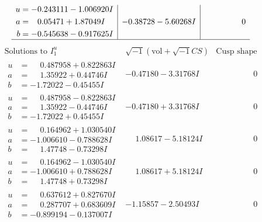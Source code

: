 \documentclass[1p]{elsarticle_modified}
\theoremstyle{definition}
\newcommand{\I}{\sqrt{-1}}
\begin{document}
$$\begin{array}{c|c|c}
\begin{aligned}
u &= -0.243111 - 1.006920 I \\
a &= \phantom{-}0.05471 + 1.87049 I \\
b &= -0.545638 - 0.917625 I\end{aligned}
 & -0.38728 - 5.60268 I & \phantom{-0.000000 } 0\\
 \hline 
 \end{array}$$\newpage$$\begin{array}{c|c|c}  
\text{Solutions to }I^u_{1}& \I (\text{vol} + \sqrt{-1}CS) & \text{Cusp shape}\\
 \hline 
\begin{aligned}
u &= \phantom{-}0.487958 + 0.822863 I \\
a &= \phantom{-}1.35922 + 0.44746 I \\
b &= -1.72022 - 0.45455 I\end{aligned}
 & -0.47180 - 3.31768 I & \phantom{-0.000000 } 0 \\ \hline\begin{aligned}
u &= \phantom{-}0.487958 - 0.822863 I \\
a &= \phantom{-}1.35922 - 0.44746 I \\
b &= -1.72022 + 0.45455 I\end{aligned}
 & -0.47180 + 3.31768 I & \phantom{-0.000000 } 0 \\ \hline\begin{aligned}
u &= \phantom{-}0.164962 + 1.030540 I \\
a &= -1.006610 - 0.788628 I \\
b &= \phantom{-}1.47748 - 0.73298 I\end{aligned}
 & \phantom{-}1.08617 - 5.18124 I & \phantom{-0.000000 } 0 \\ \hline\begin{aligned}
u &= \phantom{-}0.164962 - 1.030540 I \\
a &= -1.006610 + 0.788628 I \\
b &= \phantom{-}1.47748 + 0.73298 I\end{aligned}
 & \phantom{-}1.08617 + 5.18124 I & \phantom{-0.000000 } 0 \\ \hline\begin{aligned}
u &= \phantom{-}0.637612 + 0.827670 I \\
a &= \phantom{-}0.287707 + 0.683609 I \\
b &= -0.899194 - 0.137007 I\end{aligned}
 & -1.15857 - 2.50493 I & \phantom{-0.000000 } 0 \\ \hline\begin{aligned}

\end{aligned}
\end{array}$$
\end{document}
